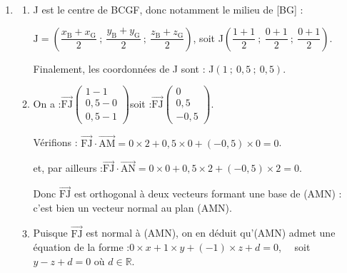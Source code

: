 \documentclass[10pt]{article}
\providecommand{\R}{\mathbb{R}}
\providecommand{\vectt}[1]{\overrightarrow{\mathrm{#1}}}
\begin{document}
\begin{enumerate}
\begin{enumerate}
			Le triangle AMN est bien rectangle en A.

			\item Le repère est orthonormal donc on peut aussi calculer des longueurs avec les coordonnées :

			$\mathrm{AM} = \sqrt{2^2 + 0^2 + 0^2} = \sqrt{4} = 2$,\quad $\mathrm{AN} = \sqrt{0^2 + 2^2 + 2^2} = \sqrt{8} = 2\sqrt{2}$.

			Avec [AM] pour base, la hauteur correspondante est [AN] puisque le triangle est rectangle en A.

			On a donc :\quad $\mathcal{A}_{\mathrm{AMN}}= \dfrac{\mathrm{AM} \times \mathrm{AN}}{2} = \dfrac{2\times 2\sqrt{2}}{2} = 2\sqrt{2}$.
		\end{enumerate}

		\item
		\begin{enumerate}
			\item J est le centre de BCGF, donc notamment le milieu de [BG] :

			$\mathrm{J} = \left(\dfrac{x_\mathrm{B} + x_{\mathrm{G}}}{2} ~;~ \dfrac{y_\mathrm{B} + y_{\mathrm{G}}}{2} ~;~ \dfrac{z_\mathrm{B} + z_{\mathrm{G}}}{2}\right)$,
			\quad soit \quad J$\left(\dfrac{1 + 1}{2} ~;~ \dfrac{0 + 1}{2}~;~ \dfrac{0 + 1}{2}\right)$.

			Finalement, les coordonnées de J sont : \quad J$(1 ~;~ 0,5 ~;~ 0,5)$.

			\item On a :\quad $\vectt{FJ} \begin{pmatrix} 1 - 1\\0,5 - 0\\0,5 - 1 \end{pmatrix}$\quad soit :\quad $\vectt{FJ} \begin{pmatrix} 0\\0,5\\-0,5\end{pmatrix}$.

			Vérifions : \quad $\vectt{FJ} \cdot \vectt{AM} = 0 \times 2 + 0,5 \times 0 + (-0,5) \times 0 = 0$.

			et, par ailleurs :\quad $\vectt{FJ} \cdot \vectt{AN} = 0 \times 0 + 0,5 \times 2 + (-0,5) \times 2 = 0$.

			Donc $\vectt{FJ}$ est orthogonal à deux vecteurs formant une base de (AMN) : c'est bien un vecteur normal au plan (AMN).

			\item Puisque $\vectt{FJ}$ est normal à (AMN), on en déduit qu'(AMN) admet une équation de la forme :\quad $0\times x + 1\times y + (- 1)\times z + d = 0$,~~ soit ~~$y - z + d = 0$ \quad où $d \in \R$.


\end{enumerate}
\end{enumerate}
\end{document}
